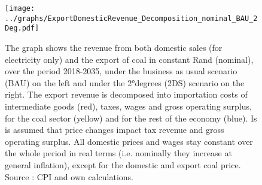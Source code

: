 \documentclass[12pt,english]{article}
\begin{document}

\begin{figure}[!t]
	\hspace{-10pt}\texttt{[image: ../graphs/ExportDomesticRevenue\_Decomposition\_nominal\_BAU\_2Deg.pdf]}
	\caption{\label{ExportDomesticRevenue_Decomposition_BAU_2DS}\small The graph shows the revenue from both domestic sales (for electricity only) and the export of coal in constant Rand (nominal), over the period 2018-2035, under the business as usual scenario (BAU) on the left and under the 2°degrees (2DS) scenario on the right. The export revenue is decomposed into importation costs of intermediate goods (red), taxes, wages and gross operating surplus, for the coal sector (yellow) and for the rest of the economy (blue). Is is assumed that price changes impact tax revenue and gross operating surplus. All domestic prices and wages stay constant  over the whole period in real terms (i.e. nominally they increase at general inflation), except for the domestic and export coal price. Source : CPI and own calculations. }
\end{figure}
\end{document}
